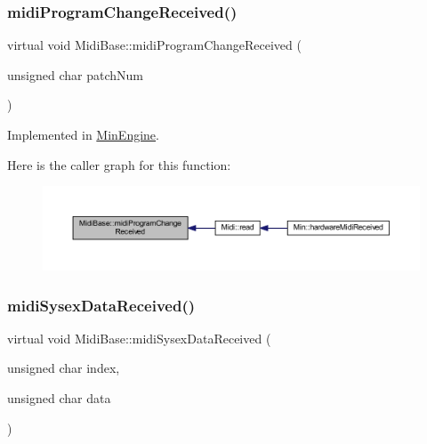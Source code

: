 \subsubsection{\texorpdfstring{midi\+Program\+Change\+Received()}{midiProgramChangeReceived()}}
{\footnotesize\ttfamily virtual void Midi\+Base\+::midi\+Program\+Change\+Received (\begin{DoxyParamCaption}\item[{unsigned char}]{patch\+Num }\end{DoxyParamCaption})\hspace{0.3cm}{\ttfamily [pure virtual]}}



Implemented in \hyperlink{class_min_engine_a0e772deba3710b21ef14f7a72994edb1}{Min\+Engine}.

Here is the caller graph for this function\+:
\nopagebreak
\begin{figure}[H]
\begin{center}
\leavevmode
\includegraphics[width=350pt]{class_midi_base_a968da0cf67e9a84757cbc2dbce90bc39_icgraph}
\end{center}
\end{figure}
\mbox{\label{class_midi_base_ade00871c0c9e32bfacf34480faf0d37b}} 
\subsubsection{\texorpdfstring{midi\+Sysex\+Data\+Received()}{midiSysexDataReceived()}}
{\footnotesize\ttfamily virtual void Midi\+Base\+::midi\+Sysex\+Data\+Received (\begin{DoxyParamCaption}\item[{unsigned char}]{index,  }\item[{unsigned char}]{data }\end{DoxyParamCaption})\hspace{0.3cm}{\ttfamily [pure virtual]}}



